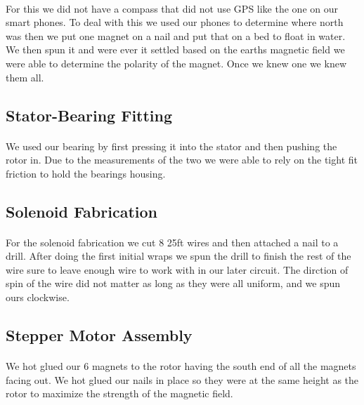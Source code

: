 \documentclass[12pt]{article}
\begin{document}
			\paragraph{}
				For this we did not have a compass that did not use GPS like the one on 
				our smart phones.  To deal with this we used our phones to determine where 
				north was then we put one magnet on a nail and put that on a bed to float 
				in water.  We then spun it and were ever it settled based on the earths 
				magnetic field we were able to determine the polarity of the magnet.  Once
				we knew one we knew them all.

		\subsection{Stator-Bearing Fitting}
			\paragraph{}
				We used our bearing by first pressing it into the stator and then pushing 
				the rotor in.  Due to the measurements of the two we were able to rely on 
				the tight fit friction to hold the bearings housing.

		\subsection{Solenoid Fabrication}
			\paragraph{}
				For the solenoid fabrication we cut 8 25ft wires and then attached a nail 
				to a drill.  After doing the first initial wraps we spun the drill to finish
				the rest of the wire sure to leave enough wire to work with in our later 
				circuit.  The dirction of spin of the wire did not matter as long as they 
				were all uniform, and we spun ours clockwise. 

		\subsection{Stepper Motor Assembly}
			\paragraph{}
				We hot glued our 6 magnets to the rotor having the south end of all the magnets 
				facing out.  We hot glued our nails in place so they were at the same height as 
				the rotor to maximize the strength of the magnetic field.
\end{document}

